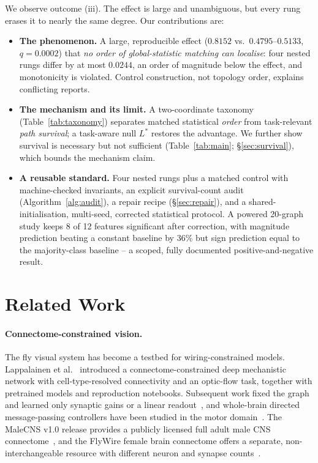 \documentclass[10pt,twocolumn,letterpaper]{article}
\begin{document}
We observe outcome (iii). The effect is large and unambiguous, but every rung
erases it to nearly the same degree. Our contributions are:

\begin{itemize}
\item \textbf{The phenomenon.} A large, reproducible effect ($0.8152$ vs.\
  $0.4795$--$0.5133$, $q=0.0002$) that \emph{no order of global-statistic
  matching can localise}: four nested rungs differ by at most $0.0244$, an
  order of magnitude below the effect, and monotonicity is violated. Control
  construction, not topology order, explains conflicting reports.
\item \textbf{The mechanism and its limit.} A two-coordinate taxonomy
  (Table~\ref{tab:taxonomy}) separates matched statistical \emph{order} from
  task-relevant \emph{path survival}; a task-aware null $L^*$ restores the
  advantage. We further show survival is necessary but not sufficient
  (Table~\ref{tab:main}; \S\ref{sec:survival}), which bounds the mechanism claim.
\item \textbf{A reusable standard.} Four nested rungs plus a matched control
  with machine-checked invariants, an explicit survival-count audit
  (Algorithm~\ref{alg:audit}), a repair recipe (\S\ref{sec:repair}), and a
  shared-initialisation, multi-seed, corrected statistical protocol. A powered
  20-graph study keeps 8 of 12 features significant after correction, with
  magnitude prediction beating a constant baseline by 36\% but sign prediction
  equal to the majority-class baseline -- a scoped, fully documented
  positive-and-negative result.
\end{itemize}

\section{Related Work}
\label{sec:related}

\paragraph{Connectome-constrained vision.}
The fly visual system has become a testbed for wiring-constrained models.
Lappalainen et al.~\cite{lappalainen2024} introduced a connectome-constrained
deep mechanistic network with cell-type-resolved connectivity and an
optic-flow task, together with pretrained models and reproduction notebooks.
Subsequent work fixed the graph and learned only synaptic gains or a linear
readout~\cite{structurealone2026}, and whole-brain
directed message-passing controllers have been studied in the motor
domain~\cite{flygm2026}. The MaleCNS v1.0 release provides a publicly
licensed full adult male CNS connectome~\cite{malecns2026}, and the FlyWire
female brain connectome offers a separate, non-interchangeable resource
with different neuron and synapse counts~\cite{dorkenwald2024}.
\end{document}
